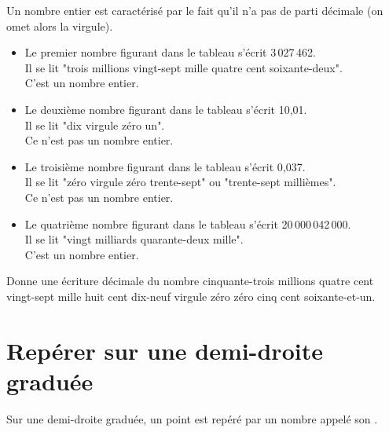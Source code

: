Un nombre entier est caractérisé par le fait qu'il n'a pas de parti décimale (on omet alors la virgule).
\begin{exemple*1}
\begin{itemize}
 \item Le premier nombre figurant dans le tableau s'écrit 3\,027\,462.\\
Il se lit "trois millions vingt-sept mille quatre cent soixante-deux".\\
C'est un nombre entier.\\
 \item Le  deuxième nombre figurant dans le tableau s’écrit 10,01.\\
Il se lit "dix virgule zéro un".\\
Ce n’est pas un nombre entier.\\
 \item Le troisième nombre figurant dans le tableau s’écrit 0,037.\\
Il se lit "zéro virgule zéro trente-sept" ou "trente-sept millièmes".\\
Ce n’est pas un nombre entier.\\
 \item Le quatrième nombre figurant dans le tableau s’écrit 20\,000\,042\,000.\\
Il se lit "vingt milliards quarante-deux mille".\\
C’est un nombre entier.\\
 \end{itemize}
\end{exemple*1}


Donne une écriture décimale du nombre cinquante-trois millions quatre cent vingt-sept mille huit cent dix-neuf virgule zéro zéro cinq cent soixante-et-un.


\section{Repérer sur une demi-droite graduée}

\begin{aconnaitre}
Sur une demi-droite graduée, un point est repéré par un nombre appelé son \textbf{}.
\end{aconnaitre}


